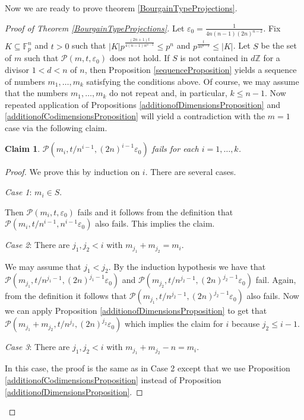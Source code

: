 \documentclass{amsart}
\newtheorem{claim}[theorem]{Claim}
\newcommand{\F}{\mathbb F}
\begin{document}
Now we are ready to prove theorem \ref{BourgainTypeProjections}.

\begin{proof}[Proof of Theorem \ref{BourgainTypeProjections}]
    Let $\varepsilon_0 = \frac{1}{4n(n - 1)(2n)^{n - 2}}$. Fix $K \subseteq \F_p^n$ and $t > 0$ such that $|K|p^{\frac{(2n + 1)t}{4(n - 1)n^{n - 2}}} \leq p^n$ and $ p^{\frac{t}{4 n^{n - 2}}} \leq |K|$. Let $S$ be the set of $m$ such that $\mathcal{P}(m, t, \varepsilon_0)$ does not hold. If $S$ is not contained in $d \mathbb{Z}$ for a divisor $1 < d < n$ of $n$, then Proposition \ref{sequenceProposition} yields a sequence of numbers $m_1, \ldots, m_k$ satisfying the conditions above. Of course, we may assume that the numbers $m_1, \ldots, m_k$ do not repeat and, in particular, $k \leq n - 1$.
    Now repeated application of Propositions \ref{additionofDimensionsProposition} and \ref{additionofCodimensionsProposition} will yield a contradiction with the $m = 1$ case via the following claim.
    \begin{claim}
        $\mathcal{P}(m_i, t/n^{i - 1}, (2n)^{i - 1}\varepsilon_0)$ fails for each $i = 1, \ldots, k$.
    \end{claim}
    
    \begin{proof}
        We prove this by induction on $i$. There are several cases.
        
        \textit{Case 1}: $m_i \in S$. 

        Then $\mathcal{P}(m_i, t, \varepsilon_0)$ fails and it follows from the definition that $\mathcal{P}(m_i, t/n^{i - 1}, n^{i - 1}\varepsilon_0)$ also fails. This implies the claim.

        \textit{Case 2}: There are $j_1, j_2 < i$ with $m_{j_1} + m_{j_2} = m_i$.

        We may assume that $j_1 < j_2$. By the induction hypothesis we have that $\mathcal{P}(m_{j_1}, t/n^{j_1 - 1}, (2n)^{j_1 - 1}\varepsilon_0)$ and $\mathcal{P}(m_{j_2}, t/n^{j_2 - 1}, (2n)^{j_2 - 1}\varepsilon_0)$ fail. Again, from the definition it follows that $\mathcal{P}(m_{j_1}, t/n^{j_2 - 1}, (2n)^{j_2 - 1}\varepsilon_0)$ also fails. Now we can apply Proposition \ref{additionofDimensionsProposition} to get that $\mathcal{P}(m_{j_1} + m_{j_2}, t/n^{j_2}, (2n)^{j_2}\varepsilon_0)$ which implies the claim for $i$ because $j_2 \leq i - 1$.

        \textit{Case 3}: There are $j_1, j_2 < i$ with $m_{j_1} + m_{j_2} - n = m_i$.

        In this case, the proof is the same as in Case 2 except that we use Proposition \ref{additionofCodimensionsProposition} instead of Proposition \ref{additionofDimensionsProposition}.
    \end{proof}
    

\end{proof}
\end{document}
